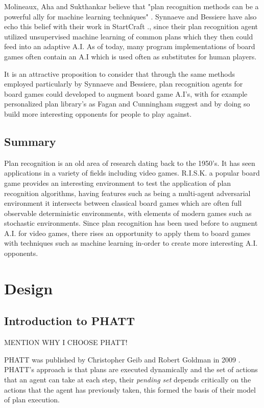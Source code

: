 \documentclass[parskip]{cs4rep}
\begin{document}
Molineaux, Aha and Sukthankar believe that "plan recognition methods can be a powerful ally for machine learning techniques" \cite{Molineaux09g.:beating}. Synnaeve and Bessiere have also echo this belief with their work in StartCraft \cite{conf/aiide/SynnaeveB11}., since their plan recognition agent utilized unsupervised machine learning of common plans which they then could feed into an adaptive A.I. As of today, many program implementations of board games often contain an A.I which is used often as substitutes for human players.

It is an attractive proposition to consider that through the same methods employed particularly by Synnaeve and Bessiere, plan recognition agents for board games could developed to augment board game A.I's, with for example personalized plan library's as Fagan and Cunningham suggest \cite{Fagan03case-basedplan} and by doing so build more interesting opponents for people to play against.

\section{Summary}

Plan recognition is an old area of research dating back to the 1950's. It has seen applications in a variety of fields including video games. R.I.S.K. a popular board game provides an interesting environment to test the application of plan recognition algorithms, having features such as being a multi-agent adversarial environment it intersects between classical board games which are often full observable deterministic environments, with elements of modern games such as stochastic environments. Since plan recognition has been used before to augment A.I. for video games, there rises an opportunity to apply them to board games with techniques such as machine learning in-order to create more interesting A.I. opponents.

\chapter{Design}

\section{Introduction to PHATT}

MENTION WHY I CHOOSE PHATT!

PHATT was published by Christopher Geib and Robert Goldman in 2009 \cite{Geib:2009:PPR:1550966.1551246}. PHATT's approach is that plans are executed dynamically and the set of actions that an agent can take at each step, their \textit{pending set} depends critically on the actions that the agent has previously taken, this formed the basis of their model of plan execution.
\end{document}
